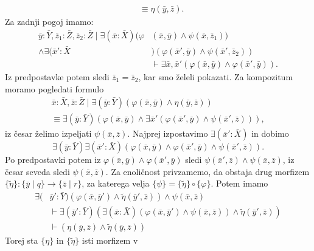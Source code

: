 \documentclass[../kategoricna_logika.tex]{subfiles}
\begin{document}
\begin{dokaz}
\begin{enumerate}[label=(\roman*)]
\begin{align*}
           &\equiv \eta(\bar{y},\bar{z}).
    \end{align*}
    Za zadnji pogoj imamo:
\begin{align*}
  \bar{y}:\bar{Y},\bar{z}_{1}:\bar{Z},\bar{z}_{2}:\bar{Z} \mid
  \exists (\bar{x}:\bar{X})(\varphi&(\bar{x},\bar{y}) \land \psi(\bar{x},\bar{z}_1)) \\
  \land \exists (\bar{x}':\bar{X}&)
  (\varphi(\bar{x}',\bar{y}) \land \psi(\bar{x}',\bar{z}_2)) \\
  &\vdash \exists
      \bar{x},\bar{x}'(\varphi(\bar{x},\bar{y}) \land \varphi(\bar{x}',\bar{y})).
      \end{align*}
    Iz predpostavke potem
    sledi $\bar{z}_1 = \bar{z}_2$, kar smo želeli pokazati.
    Za kompozitum moramo pogledati formulo
\begin{multline*}
  \bar{x}:\bar{X},\bar{z}:\bar{Z} \mid \exists (\bar{y}:\bar{Y})(\varphi(\bar{x},\bar{y}) \land \eta(\bar{y},\bar{z})) \\
  \equiv \exists
      (\bar{y}:\bar{Y})(\varphi(\bar{x},\bar{y}) \land \exists \bar{x}'(\varphi(\bar{x}',\bar{y}) \land \psi(\bar{x}',\bar{z}))
      ),
      \end{multline*}
    iz česar želimo izpeljati $\psi(\bar{x},\bar{z})$. Najprej izpostavimo
    $\exists (\bar{x}':\bar{X})$ in dobimo
    \[\exists (\bar{y}:\bar{Y}) \exists (\bar{x}':\bar{X})( \varphi(\bar{x},\bar{y}) \land \varphi(\bar{x}',\bar{y}) \land
      \psi(\bar{x}',\bar{z})). \]
    Po predpostavki potem iz
    $\varphi(\bar{x},\bar{y}) \land \varphi(\bar{x}',\bar{y})$ sledi
    $\psi(\bar{x}',\bar{z}) \land \psi(\bar{x},\bar{z})$, iz česar seveda sledi $\psi(\bar{x},\bar{z})$.
    Za enoličnost privzamemo, da obstaja drug morfizem
    $\{\tilde{\eta}\} : \{\bar{y} \mid q\} \to \{\bar{z} \mid r\}$,
    za katerega velja
    $\{\psi\} = \{\tilde{\eta}\} \circ \{\varphi \}$.
    Potem imamo
    \begin{align*}
     \exists (&\bar{y}':\bar{Y})(\varphi(\bar{x},\bar{y}') \land \tilde{\eta}(\bar{y}',\bar{z})) \land \psi(\bar{x},\bar{z}) \\
                                                &\vdash \exists (\bar{y}':\bar{Y}) (\exists (\bar{x}:\bar{X} )(\varphi(\bar{x},\bar{y}') \land \psi(\bar{x},\bar{z})) \land \tilde{\eta}(\bar{y}',\bar{z})) \\
                                                &\vdash (\eta(\bar{y},\bar{z}) \land \tilde{\eta}(\bar{y},\bar{z}))
    \end{align*}
    Torej sta $\{\eta\}$ in $\{\tilde{\eta}\}$ isti morfizem v

\end{enumerate}
\end{dokaz}
\end{document}
